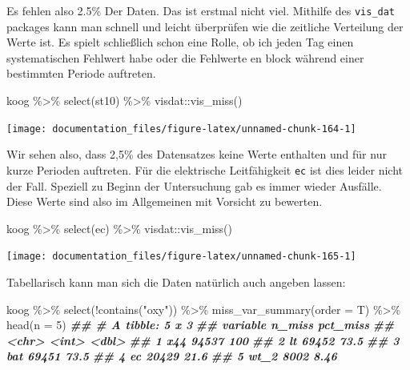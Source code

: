 \documentclass[
]{article}
\newenvironment{Shaded}{\begin{snugshade}}{\end{snugshade}}
\newcommand{\AttributeTok}[1]{\textcolor[rgb]{0.77,0.63,0.00}{#1}}
\newcommand{\DecValTok}[1]{\textcolor[rgb]{0.00,0.00,0.81}{#1}}
\newcommand{\DocumentationTok}[1]{\textcolor[rgb]{0.56,0.35,0.01}{\textbf{\textit{#1}}}}
\newcommand{\FunctionTok}[1]{\textcolor[rgb]{0.00,0.00,0.00}{#1}}
\newcommand{\NormalTok}[1]{#1}
\newcommand{\SpecialCharTok}[1]{\textcolor[rgb]{0.00,0.00,0.00}{#1}}
\newcommand{\StringTok}[1]{\textcolor[rgb]{0.31,0.60,0.02}{#1}}
\begin{document}
Es fehlen also 2.5\% Der Daten. Das ist erstmal nicht viel. Mithilfe des \texttt{vis\_dat} packages kann man schnell und leicht überprüfen wie die zeitliche Verteilung der Werte ist. Es spielt schließlich schon eine Rolle, ob ich jeden Tag einen systematischen Fehlwert habe oder die Fehlwerte en block während einer bestimmten Periode auftreten.

\begin{Shaded}
\begin{Highlighting}[]
\NormalTok{koog }\SpecialCharTok{\%\textgreater{}\%}
  \FunctionTok{select}\NormalTok{(st10) }\SpecialCharTok{\%\textgreater{}\%}
\NormalTok{  visdat}\SpecialCharTok{::}\FunctionTok{vis\_miss}\NormalTok{()}
\end{Highlighting}
\end{Shaded}

\begin{center}\texttt{[image: documentation\_files/figure-latex/unnamed-chunk-164-1]} \end{center}

Wir sehen also, dass 2,5\% des Datensatzes keine Werte enthalten und für nur kurze Perioden auftreten. Für die elektrische Leitfähigkeit \texttt{ec} ist dies leider nicht der Fall. Speziell zu Beginn der Untersuchung gab es immer wieder Ausfälle. Diese Werte sind also im Allgemeinen mit Vorsicht zu bewerten.

\begin{Shaded}
\begin{Highlighting}[]
\NormalTok{koog }\SpecialCharTok{\%\textgreater{}\%}
  \FunctionTok{select}\NormalTok{(ec) }\SpecialCharTok{\%\textgreater{}\%}
\NormalTok{  visdat}\SpecialCharTok{::}\FunctionTok{vis\_miss}\NormalTok{()}
\end{Highlighting}
\end{Shaded}

\begin{center}\texttt{[image: documentation\_files/figure-latex/unnamed-chunk-165-1]} \end{center}

Tabellarisch kann man sich die Daten natürlich auch angeben lassen:

\begin{Shaded}
\begin{Highlighting}[]
\NormalTok{koog }\SpecialCharTok{\%\textgreater{}\%}
  \FunctionTok{select}\NormalTok{(}\SpecialCharTok{!}\FunctionTok{contains}\NormalTok{(}\StringTok{"oxy"}\NormalTok{)) }\SpecialCharTok{\%\textgreater{}\%}
  \FunctionTok{miss\_var\_summary}\NormalTok{(}\AttributeTok{order =}\NormalTok{ T) }\SpecialCharTok{\%\textgreater{}\%}
  \FunctionTok{head}\NormalTok{(}\AttributeTok{n =} \DecValTok{5}\NormalTok{)}
\DocumentationTok{\#\# \# A tibble: 5 x 3}
\DocumentationTok{\#\#   variable n\_miss pct\_miss}
\DocumentationTok{\#\#   \textless{}chr\textgreater{}     \textless{}int\textgreater{}    \textless{}dbl\textgreater{}}
\DocumentationTok{\#\# 1 x44       94537   100   }
\DocumentationTok{\#\# 2 lt        69452    73.5 }
\DocumentationTok{\#\# 3 bat       69451    73.5 }
\DocumentationTok{\#\# 4 ec        20429    21.6 }
\DocumentationTok{\#\# 5 wt\_2       8002     8.46}
\end{Highlighting}
\end{Shaded}
\end{document}
